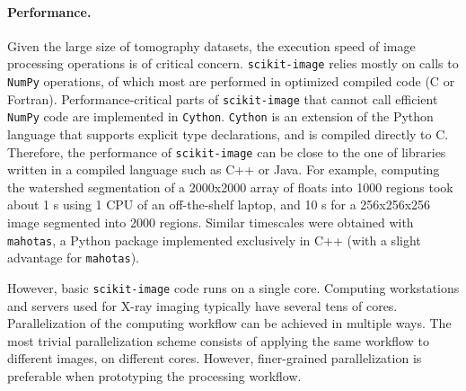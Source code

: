 \documentclass[twocolumn]{bmcart}%
\begin{document}
\paragraph{Performance.}

Given the large size of tomography datasets, the execution speed of image
processing operations is of critical concern. \texttt{scikit-image}
relies mostly on calls to \texttt{NumPy} operations, of which most are
performed in optimized compiled code (C or Fortran). Performance-critical
parts of \texttt{scikit-image} that cannot call efficient \texttt{NumPy}
code are implemented in \texttt{Cython}. \texttt{Cython}
\citep{Behnel2011} is an extension of the Python language that supports
explicit type declarations, and is compiled directly to C. Therefore, the
performance of \texttt{scikit-image} can be close to the one of libraries
written in a compiled language such as C++ or Java. For example,
computing the watershed segmentation of a 2000x2000 array of floats into
1000 regions took about 1 s using 1 CPU of an off-the-shelf laptop, and
10 s for a 256x256x256 image segmented into 2000 regions. Similar
timescales were obtained with \texttt{mahotas}, a Python package
implemented exclusively in C++ \citep{Coelho2013} (with a slight advantage
for \texttt{mahotas}).

However, basic \texttt{scikit-image} code runs on a single core. Computing
workstations and servers used for X-ray imaging typically have several tens of
cores. Parallelization of the computing workflow can be achieved in multiple
ways. The most trivial parallelization scheme consists of applying the same
workflow to different images, on different cores. However, finer-grained
parallelization is preferable when prototyping the processing workflow.
\end{document}
